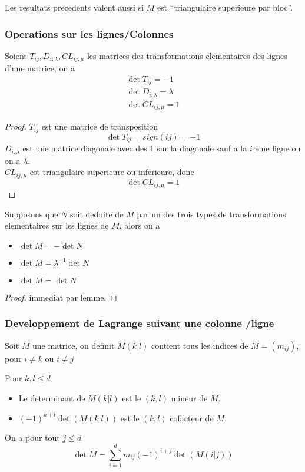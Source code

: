 \documentclass[../main.tex]{subfiles}
\begin{document}
\begin{rmq}
Les resultats precedents valent aussi si $M$ est ``triangulaire superieure par bloc''.
\end{rmq}
\subsubsection{Operations sur les lignes/Colonnes}
\begin{lemma}
Soient $T_{ij} , D_{i,\lambda} , CL_{ij,\mu} $ les matrices des transformations elementaires des lignes d'une matrice, on a
\begin{align*}
\det T_{ij} = -1\\
\det D_{i,\lambda} = \lambda\\
\det CL_{ij,\mu} = 1
\end{align*}
\begin{proof}
$T_{ij} $ est une matrice de transposition
\[ 
	\det T_{ij} = sign( ij) = -1
\]
$D_{i,\lambda} $ est une matrice diagonale avec des 1 sur la diagonale sauf a la $i$ eme ligne ou on a $\lambda$.\\
$CL_{ij,\mu} $ est triangulaire superieure ou inferieure, donc
\[ 
\det CL_{ij,\mu} = 1
\]


\end{proof}

\end{lemma}
\begin{crly}
Supposons que $N$ soit deduite de $M$ par un des trois types de transformations elementaires sur les lignes de $M$, alors on a
\begin{itemize}
\item $\det M = - \det N$ 
\item $\det M = \lambda^{-1}\det N$ 
\item $\det M = \det N$
\end{itemize}

\end{crly}
\begin{proof}
immediat par lemme.
\end{proof}
\subsubsection{Developpement de Lagrange suivant une colonne /ligne}
Soit $M$ une matrice, on definit $M( k|l) $ contient tous les indices de $M=( m_{ij} ) $, pour $i\neq k$ ou $i \neq j$

\begin{defn}
Pour $k,l\leq d$ 
\begin{itemize}
	\item Le determinant de $M( k|l) $ est le $( k,l) $ mineur de $M$.
	\item $( -1)^{k+l}\det( M( k|l) ) $ est le $( k,l) $ cofacteur de $M$.
\end{itemize}

\end{defn}
\begin{thm}
On a pour tout $j\leq d$ 
\[ 
	\det M = \sum_{i=1}^{d} m_{ij} ( -1)^{i+j}\det( M( i|j) ) 
\]

\end{thm}
\end{document}
